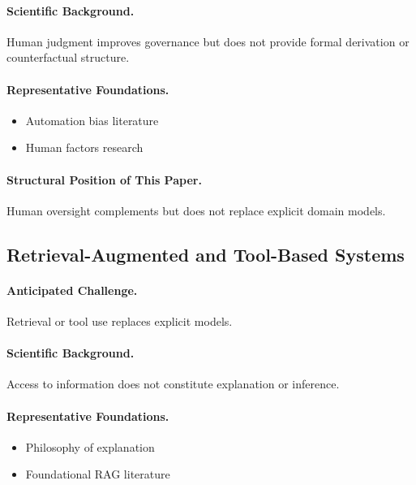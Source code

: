 \paragraph{Scientific Background.}
Human judgment improves governance but does not provide formal derivation or counterfactual structure.

\paragraph{Representative Foundations.}
\begin{itemize}
    \item Automation bias literature
    \item Human factors research
\end{itemize}

\paragraph{Structural Position of This Paper.}
Human oversight complements but does not replace explicit domain models.


\subsection{Retrieval-Augmented and Tool-Based Systems}

\paragraph{Anticipated Challenge.}
Retrieval or tool use replaces explicit models.

\paragraph{Scientific Background.}
Access to information does not constitute explanation or inference.

\paragraph{Representative Foundations.}
\begin{itemize}
    \item Philosophy of explanation
    \item Foundational RAG literature
\end{itemize}

